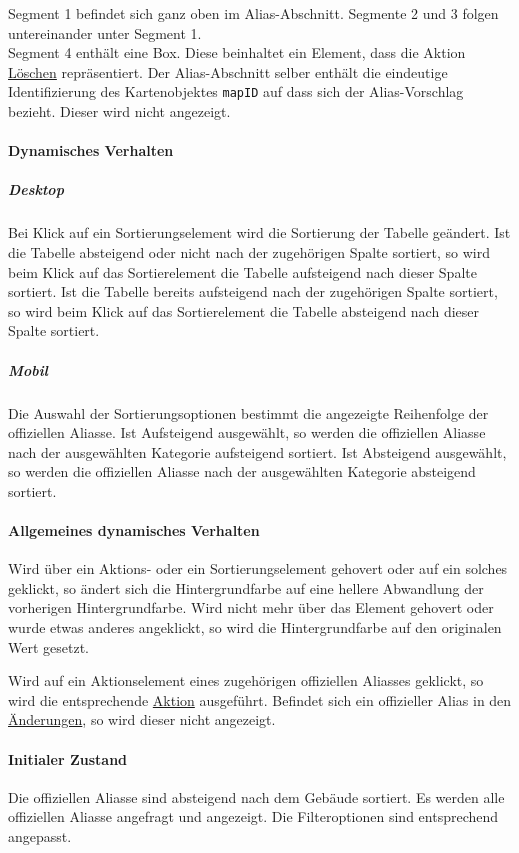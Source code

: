 Segment 1 befindet sich ganz oben im Alias-Abschnitt. Segmente 2 und 3 folgen untereinander unter Segment 1. \\
Segment 4 enthält eine Box. Diese beinhaltet ein Element, dass die Aktion \hyperref[AP_Aktionen_Offizielle_Aliasse_Loschen]{Löschen} repräsentiert.
Der Alias-Abschnitt selber enthält die eindeutige Identifizierung des Kartenobjektes \verb#mapID# auf dass sich der Alias-Vorschlag bezieht. Dieser wird nicht angezeigt.

\paragraph*{Dynamisches Verhalten}
\subparagraph*{Desktop}
Bei Klick auf ein Sortierungselement wird die Sortierung der Tabelle geändert.
Ist die Tabelle absteigend oder nicht nach der zugehörigen Spalte sortiert, so wird beim Klick auf das Sortierelement die Tabelle aufsteigend nach dieser Spalte sortiert.
Ist die Tabelle bereits aufsteigend nach der zugehörigen Spalte sortiert, so wird beim Klick auf das Sortierelement die Tabelle absteigend nach dieser Spalte sortiert.

\subparagraph*{Mobil}
Die Auswahl der Sortierungsoptionen bestimmt die angezeigte Reihenfolge der offiziellen Aliasse.
Ist \dq Aufsteigend \dq{} ausgewählt, so werden die offiziellen Aliasse nach der ausgewählten Kategorie aufsteigend sortiert.
Ist \dq Absteigend \dq{} ausgewählt, so werden die offiziellen Aliasse nach der ausgewählten Kategorie absteigend sortiert.

\paragraph*{Allgemeines dynamisches Verhalten}
Wird über ein Aktions- oder ein Sortierungselement gehovert oder auf ein solches geklickt, so ändert sich die Hintergrundfarbe auf eine hellere Abwandlung der vorherigen Hintergrundfarbe.
Wird nicht mehr über das Element gehovert oder wurde etwas anderes angeklickt, so wird die Hintergrundfarbe auf den originalen Wert gesetzt.

Wird auf ein Aktionselement eines zugehörigen offiziellen Aliasses geklickt, so wird die entsprechende \hyperref[AP_Aktionen_Offizielle_Aliasse]{Aktion} ausgeführt.
Befindet sich ein offizieller Alias in den \hyperref[AP_Changes]{Änderungen}, so wird dieser nicht angezeigt.

\paragraph*{Initialer Zustand}
Die offiziellen Aliasse sind absteigend nach dem Gebäude sortiert.
Es werden alle offiziellen Aliasse angefragt und angezeigt.
Die Filteroptionen sind entsprechend angepasst.

